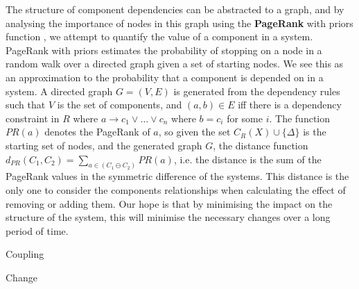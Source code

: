 The structure of component dependencies can be abstracted to a graph, 
and by analysing the importance of nodes in this graph using the \textbf{PageRank} with priors function \cite{White:2003:AER:956750.956782}, 
we attempt to quantify the value of a component in a system.
PageRank with priors estimates the probability of stopping on a node in a random walk over a directed graph given a set of starting nodes.
We see this as an approximation to the probability that a component is depended on in a system.
A directed graph $G = (V,E)$ is generated from the
dependency rules such that $V$ is the set of components, and $(a,b) \in E$ iff there is a dependency constraint in $R$ 
where $a \rightarrow c_1 \vee \ldots \vee c_n$ where $b = c_i$ for some $i$.
The function $PR(a)$ denotes the PageRank of $a$,
so given the set $C_R(X) \cup \{\Delta\}$ is the starting set of nodes, and the generated graph $G$,
the distance function $d_{PR}(C_1,C_2) = \sum_{a \in (C_1 \ominus C_2)} PR(a)$,
i.e. the distance is the sum of the PageRank values in the symmetric difference of the systems.
This distance is the only one to consider the components relationships when calculating the effect of removing or adding them.
Our hope is that by minimising the impact on the structure of the system, 
this will minimise the necessary changes over a long period of time.

Coupling

Change